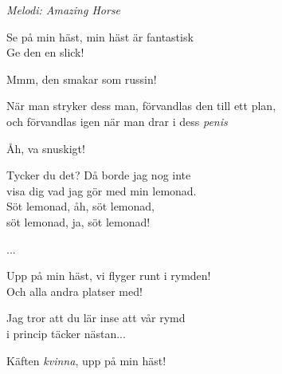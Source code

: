 {\footnotesize\textit{Melodi: Amazing Horse}}\par
\vspace{10pt}
Se på min häst, min häst är fantastisk\\
Ge den en slick!\par
\vspace{10pt}
Mmm, den smakar som russin!\par
\vspace{10pt}
När man stryker dess man, förvandlas den till ett plan,\\
och förvandlas igen när man drar i dess \textit{penis}\par
\vspace{10pt}
Åh, va snuskigt!\par
\vspace{10pt}
Tycker du det? Då borde jag nog inte\\
visa dig vad jag gör med min lemonad.\\
Söt lemonad, åh, söt lemonad,\\
söt lemonad, ja, söt lemonad!\par
\vspace{10pt}
...\par
\vspace{10pt}
Upp på min häst, vi flyger runt i rymden!\\
Och alla andra platser med!\par
\vspace{10pt}
Jag tror att du lär inse att vår rymd\\
i princip täcker nästan...\par
\vspace{10pt}
Käften \textit{kvinna}, upp på min häst!
